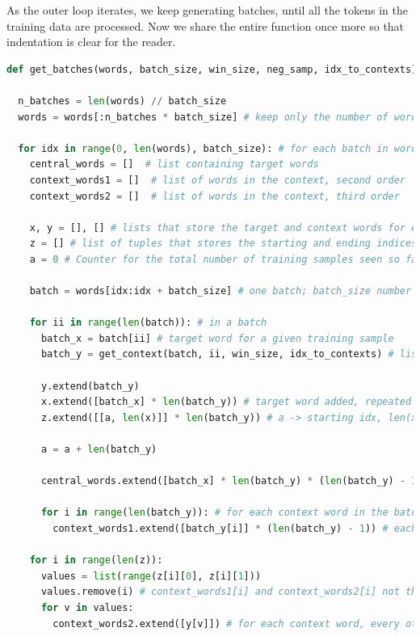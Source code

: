 As the outer loop iterates, we keep generating batches, until all the tokens in the training data are processed. Now we share the entire function once more so that indentation is clear for the reader. 

\begin{lstlisting}[language=Python, caption=Batch generating function]
def get_batches(words, batch_size, win_size, neg_samp, idx_to_contexts):

  n_batches = len(words) // batch_size
  words = words[:n_batches * batch_size] # keep only the number of words to match the bath_size and n_batches

  for idx in range(0, len(words), batch_size): # for each batch in words
    central_words = []  # list containing target words
    context_words1 = []  # list of words in the context, second order
    context_words2 = []  # list of words in the context, third order

    x, y = [], [] # lists that store the target and context words for each training sample
    z = [] # list of tuples that stores the starting and ending indices of each training sample in the x and y lists
    a = 0 # Counter for the total number of training samples seen so far. Used to keep track of the indices in z.

    batch = words[idx:idx + batch_size] # one batch; batch_size number of words (unique), starting from index idx

    for ii in range(len(batch)): # in a batch
      batch_x = batch[ii] # target word for a given training sample
      batch_y = get_context(batch, ii, win_size, idx_to_contexts) # list of context words for that target word

      y.extend(batch_y)
      x.extend([batch_x] * len(batch_y)) # target word added, repeated by the number of context words
      z.extend([[a, len(x)]] * len(batch_y)) # a -> starting idx, len(x) -> end index (for one training sample)

      a = a + len(batch_y)

      central_words.extend([batch_x] * len(batch_y) * (len(batch_y) - 1)) # target word repeated by 2 comb of context words in batch

      for i in range(len(batch_y)): # for each context word in the batch
        context_words1.extend([batch_y[i]] * (len(batch_y) - 1)) # each context word, by number of context words

    for i in range(len(z)):
      values = list(range(z[i][0], z[i][1]))
      values.remove(i) # context_words1[i] and context_words2[i] not the same
      for v in values:
        context_words2.extend([y[v]]) # for each context word, every other context word


\end{lstlisting}
